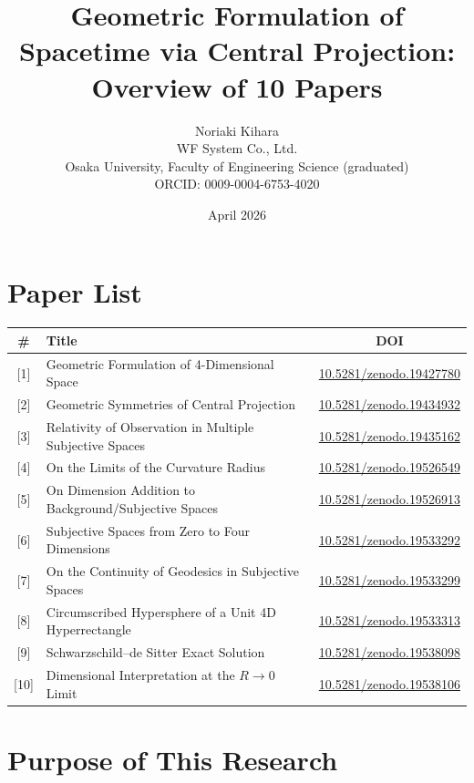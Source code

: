 \documentclass[12pt,a4paper]{article}
\title{Geometric Formulation of Spacetime via Central Projection:\\Overview of 10 Papers}
\author{Noriaki Kihara\\
WF System Co., Ltd.\\
Osaka University, Faculty of Engineering Science (graduated)\\
ORCID: 0009-0004-6753-4020}
\date{April 2026}
\begin{document}
\maketitle

\section*{Paper List}

\begin{table}[h]
\centering
\small
\begin{tabular}{clc}
\toprule
\# & Title & DOI \\
\midrule
{[1]} & Geometric Formulation of 4-Dimensional Space & \href{https://doi.org/10.5281/zenodo.19427780}{10.5281/zenodo.19427780} \\
{[2]} & Geometric Symmetries of Central Projection & \href{https://doi.org/10.5281/zenodo.19434932}{10.5281/zenodo.19434932} \\
{[3]} & Relativity of Observation in Multiple Subjective Spaces & \href{https://doi.org/10.5281/zenodo.19435162}{10.5281/zenodo.19435162} \\
{[4]} & On the Limits of the Curvature Radius & \href{https://doi.org/10.5281/zenodo.19526549}{10.5281/zenodo.19526549} \\
{[5]} & On Dimension Addition to Background/Subjective Spaces & \href{https://doi.org/10.5281/zenodo.19526913}{10.5281/zenodo.19526913} \\
{[6]} & Subjective Spaces from Zero to Four Dimensions & \href{https://doi.org/10.5281/zenodo.19533292}{10.5281/zenodo.19533292} \\
{[7]} & On the Continuity of Geodesics in Subjective Spaces & \href{https://doi.org/10.5281/zenodo.19533299}{10.5281/zenodo.19533299} \\
{[8]} & Circumscribed Hypersphere of a Unit 4D Hyperrectangle & \href{https://doi.org/10.5281/zenodo.19533313}{10.5281/zenodo.19533313} \\
{[9]} & Schwarzschild--de Sitter Exact Solution & \href{https://doi.org/10.5281/zenodo.19538098}{10.5281/zenodo.19538098} \\
{[10]} & Dimensional Interpretation at the $R \to 0$ Limit & \href{https://doi.org/10.5281/zenodo.19538106}{10.5281/zenodo.19538106} \\
\bottomrule
\end{tabular}
\end{table}

\section*{Purpose of This Research}
\end{document}
